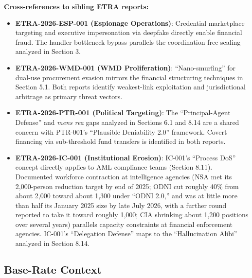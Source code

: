 \documentclass[11pt,letterpaper]{article}
\begin{document}
\textbf{Cross-references to sibling ETRA reports:}
\begin{itemize}
  \item \textbf{ETRA-2026-ESP-001 (Espionage Operations)}: Credential marketplace targeting and executive impersonation via deepfake directly enable financial fraud. The handler bottleneck bypass parallels the coordination-free scaling analyzed in Section 3.
  \item \textbf{ETRA-2026-WMD-001 (WMD Proliferation)}: ``Nano-smurfing'' for dual-use procurement evasion mirrors the financial structuring techniques in Section 5.1. Both reports identify weakest-link exploitation and jurisdictional arbitrage as primary threat vectors.
  \item \textbf{ETRA-2026-PTR-001 (Political Targeting)}: The ``Principal-Agent Defense'' and \textit{mens rea} gaps analyzed in Sections 6.1 and 8.14 are a shared concern with PTR-001's ``Plausible Deniability 2.0'' framework. Covert financing via sub-threshold fund transfers is identified in both reports.
  \item \textbf{ETRA-2026-IC-001 (Institutional Erosion)}: IC-001's ``Process DoS'' concept directly applies to AML compliance teams (Section 8.11). Documented workforce contraction at intelligence agencies (NSA met its 2,000-person reduction target by end of 2025; ODNI cut roughly 40\% from about 2,000 toward about 1,300 under ``ODNI 2.0,'' and was at little more than half its January 2025 size by late July 2026, with a further round reported to take it toward roughly 1,000; CIA shrinking about 1,200 positions over several years) parallels capacity constraints at financial enforcement agencies. IC-001's ``Delegation Defense'' maps to the ``Hallucination Alibi'' analyzed in Section 8.14.
\end{itemize}

\subsection{Base-Rate Context}
\end{document}
